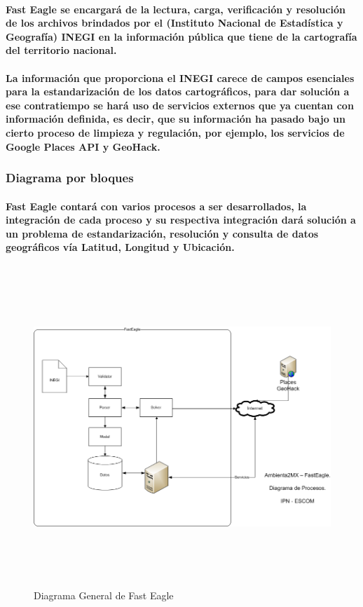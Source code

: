       \paragraph{Fast Eagle se encargará de la lectura, carga, verificación y resolución de los archivos brindados por el (Instituto Nacional de Estadística y Geografía) INEGI en la información pública que tiene de la cartografía del territorio nacional.}
      \paragraph{La información que proporciona el INEGI carece de campos esenciales para la estandarización de los datos cartográficos, para dar solución a ese contratiempo se hará uso de servicios externos que ya cuentan con información definida, es decir, que su información ha pasado bajo un cierto proceso de limpieza y regulación, por ejemplo, los servicios de Google Places API y GeoHack.}
    \subsubsection{Diagrama por bloques}
      \paragraph{Fast Eagle contará con varios procesos a ser desarrollados, la integración de cada proceso y su respectiva integración dará solución a un problema de estandarización, resolución y consulta de datos geográficos vía Latitud, Longitud y Ubicación.}
    \newpage
      \begin{landscape}
        \begin{figure}[h!]
        \centering
        \includegraphics[width=22.5cm,height=12cm]{./images/DiagramaFastEagle.png}
        \caption{Diagrama General de Fast Eagle}
      \end{figure}
      \end{landscape}
    \newpage

